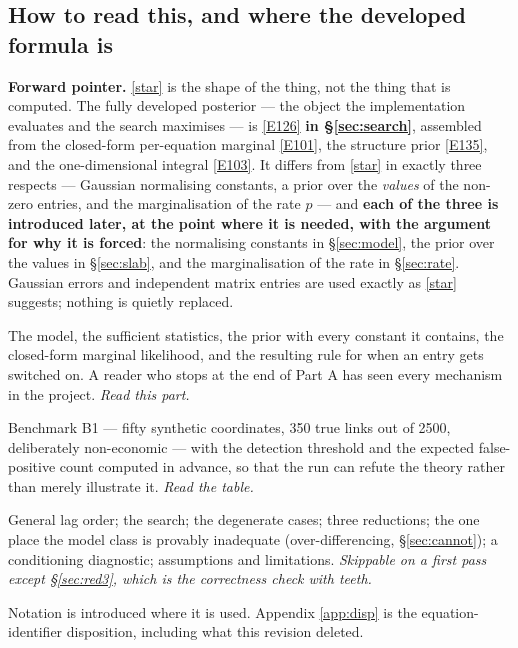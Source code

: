 \subsection*{How to read this, and where the developed formula is}

\textbf{Forward pointer.} \eqref{star} is the shape of the thing, not the thing that
is computed. The fully developed posterior --- the object the implementation
evaluates and the search maximises --- is \eqref{E126} \textbf{in
\S\ref{sec:search}}, assembled from the closed-form per-equation marginal
\eqref{E101}, the structure prior \eqref{E135}, and the one-dimensional integral
\eqref{E103}. It differs from \eqref{star} in exactly three respects --- Gaussian
normalising constants, a prior over the \emph{values} of the non-zero entries, and
the marginalisation of the rate $p$ --- and \textbf{each of the three is introduced
later, at the point where it is needed, with the argument for why it is forced}: the
normalising constants in \S\ref{sec:model}, the prior over the values in
\S\ref{sec:slab}, and the marginalisation of the rate in \S\ref{sec:rate}. Gaussian
errors and independent matrix entries are used exactly as \eqref{star} suggests;
nothing is quietly replaced.

\begin{description}[style=nextline, leftmargin=2em, topsep=0pt, itemsep=0pt]
\item[Part A, \S1--\S4: everything, at one lag.]
  The model, the sufficient statistics, the prior with every constant it contains,
  the closed-form marginal likelihood, and the resulting rule for when an entry gets
  switched on. A reader who stops at the end of Part A has seen every mechanism in
  the project. \emph{Read this part.}
\item[Part B, \S5: the worked example.]
  Benchmark B1 --- fifty synthetic coordinates, 350 true links out of 2500,
  deliberately non-economic --- with the detection threshold and the expected
  false-positive count computed in advance, so that the run can refute the theory
  rather than merely illustrate it. \emph{Read the table.}
\item[Part C, \S6--\S11: the rest.]
  General lag order; the search; the degenerate cases; three reductions; the one
  place the model class is provably inadequate (over-differencing, \S\ref{sec:cannot}); a
  conditioning diagnostic; assumptions and limitations. \emph{Skippable on a first
  pass except \S\ref{sec:red3}, which is the correctness check with teeth.}
\end{description}
Notation is introduced where it is used. Appendix \ref{app:disp} is the
equation-identifier disposition, including what this revision deleted.

